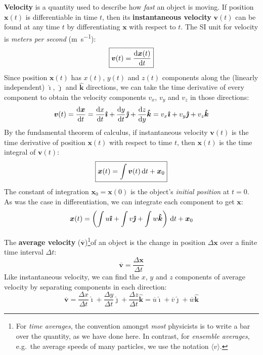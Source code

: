 \documentclass{../../oss-handout}
\begin{document}
\textbf{Velocity} is a quantity used to describe how \emph{fast} an object is
moving. If position $\bm{x}(t)$ is differentiable in time $t$, then its
\textbf{instantaneous velocity} $\bm{v}(t)$ can be found at any time $t$ by
differentiating $\bm{x}$ with respect to $t$. The SI unit for velocity is
\emph{meters per second} (\si{\metre\per\second}):
\begin{equation}
  \boxed{\bm{v}(t)= \diff{\bm{x}(t)}t}
\end{equation}
Since position $\bm{x}(t)$ has $x(t)$, $y(t)$ and $z(t)$ components along the
(linearly independent) $\bm{\hat{\imath}}$, $\bm{\hat{\jmath}}$ and
$\bm{\hat{k}}$ directions, we can take the time derivative of every component
to obtain the velocity components $v_x$, $v_y$ and $v_z$ in those directions:
\begin{equation*}
  \bm{v}(t)= \diff{\bm{x}}t=
  \diff xt\bm{\hat{\imath}} + \diff yt\bm{\hat{\jmath}} + \diff zy\bm{\hat{k}}=
  v_x\bm{\hat{\imath}} + v_y\bm{\hat{\jmath}} + v_z\bm{\hat{k}}
\end{equation*}
By the fundamental theorem of calculus, if instantaneous velocity $\bm{v}(t)$
is the time derivative of position $\bm{x}(t)$ with respect to time $t$, then
$\bm{x}(t)$ is the time integral of $\bm{v}(t)$:
\begin{equation}
  \boxed{\bm{x}(t)=\int\bm{v}(t)\dl t + \bm{x}_0}
\end{equation}
The constant of integration $\bm{x}_0=\bm{x}(0)$ is the object's \emph{initial
  position} at $t=0$. As was the case in differentiation, we can integrate each
component to get $\bm{x}$:
\begin{equation*}
  \bm{x}(t)= \left(
  \int u\bm{\hat{\imath}} + \int v\bm{\hat{\jmath}} + \int w\bm{\hat{k}}
  \right)\dl t + \bm{x}_0
\end{equation*}


The \textbf{average velocity} ($\overline{\bm{v}}$)\footnote{For
  \emph{time averages}, the convention amongst \emph{most} physicists is to
  write a bar over the quantity, as we have done here. In contrast, for
  \emph{ensemble averages}, e.g.\ the average speeds of many particles, we use
  the notation $\langle v\rangle$. %
}of an object is the change in position $\Delta\bm{x}$ over a finite time
interval $\Delta t$:
\begin{equation}
  \boxed{\overline{\bm{v}}= \frac{\Delta\bm{x}}{\Delta t}}
\end{equation}
Like instantaneous velocity, we can find the $x$, $y$ and $z$ components of
average velocity by separating components in each direction:
\begin{equation*}
  \overline{\bm{v}}=
  \frac{\Delta x}{\Delta t}\bm{\hat{\imath}} +
  \frac{\Delta y}{\Delta t}\bm{\hat{\jmath}} +
  \frac{\Delta z}{\Delta t}\bm{\hat{k}} =
  \overline{u}\bm{\hat{\imath}} +
  \overline{v}\bm{\hat{\jmath}} +
  \overline{w}\bm{\hat{k}}
\end{equation*}
\end{document}

